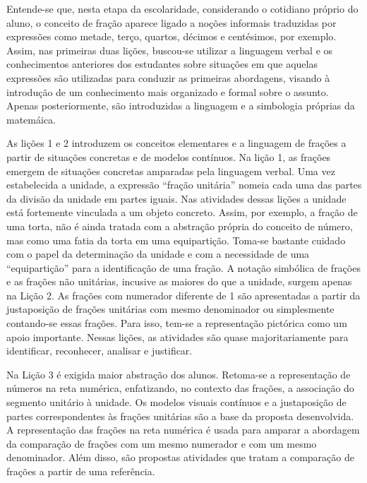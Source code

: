 \documentclass[a4,12pt,openany]{book}
\begin{document}

Entende-se que, nesta etapa da escolaridade, considerando o cotidiano próprio do aluno, o conceito de fração aparece ligado a  noções informais traduzidas por expressões como metade, terço, quartos, décimos e centésimos, por exemplo. Assim, nas primeiras duas lições, buscou-se utilizar a linguagem verbal e os conhecimentos anteriores dos estudantes sobre situações em que aquelas expressões são utilizadas para conduzir as primeiras abordagens, visando à introdução de um conhecimento mais organizado e formal sobre o assunto. Apenas posteriormente, são introduzidas a linguagem e a simbologia próprias da matemáica. 

As lições 1 e 2 introduzem os conceitos elementares e a linguagem de frações a partir de situações concretas e de modelos contínuos. Na lição 1, as frações emergem de situações concretas amparadas pela linguagem verbal. Uma vez estabelecida a unidade, a expressão ``fração unitária'' nomeia cada uma das partes da divisão da unidade em partes iguais. Nas atividades dessas lições a unidade está fortemente vinculada a um objeto concreto. Assim, por exemplo, a fração de uma torta, não é ainda tratada com a abstração própria do conceito de número, mas como uma fatia da torta em uma equipartição. Toma-se bastante cuidado com o papel da determinação da unidade e com a necessidade de uma ``equipartição'' para a identificação de uma fração. A notação simbólica de frações e as frações não unitárias, incusive as maiores do que a unidade, surgem apenas na Lição 2. As frações com numerador diferente de 1 são apresentadas a partir da justaposição de frações unitárias com mesmo denominador ou simplesmente contando-se essas frações. Para isso, tem-se a representação pictórica como um apoio importante. Nessas lições, as atividades são quase majoritariamente para identificar, reconhecer, analisar e justificar. 

Na Lição 3 é exigida maior abstração dos alunos. Retoma-se a representação de números na reta numérica, enfatizando, no contexto das frações, a associação do segmento unitário à unidade. Os modelos visuais contínuos e a justaposição de partes correspondentes às frações unitárias são a base da proposta desenvolvida. A representação das frações na reta numérica é usada para amparar a abordagem da comparação de frações com um mesmo numerador e com um mesmo denominador. Além disso, são propostas atividades que tratam a comparação de frações a partir de uma referência.
\end{document}

